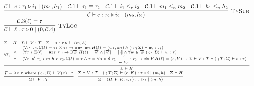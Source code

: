 \documentclass[fleqn]{article}
\begin{document}
\[\begin{array}{l}
	\infer[\textsc{TySub}]{\jtygc{\mathcal{C} }{ e }{\tau_2 }{ i_2 }{ m_2}{h_2}}{\jtygc{\mathcal{C} }{ e }{ \tau_1 }{ i_1 }{ m_1 }{h_1} & \mathcal{C}.1 \vdash \tau_1 \equiv \tau_2 & \mathcal{C}.1 \vdash i_1 \le_r i_2 & \mathcal{C}.1 \vdash m_1 \le_n m_2 & \mathcal{C}.1 \vdash h_1 \le_n h_2} \\
	
	\infer[\textsc{TyLoc}]{\jtygc{\mathcal{C}}{\ell}{\tau}{0}{0}{\mathcal{C}.4}}{ \mathcal{C}.3(\ell) = \tau  }
\end{array}
\]

\[
\scriptsize
\begin{array}{l}
	\Sigma \vdash H \hspace{1em} \Sigma \vdash V : \mathcal{T} \hspace{1em} \Sigma \vdash \sigma : \tau \triangleright i \mid (m, h) \\
	\infer{\Sigma \vdash H}{\forall \ell, \begin{array}{cl} & (\forall \tau_1~\tau_2. \Sigma(\ell) = \tau_1 \times \tau_2 \rightarrow \exists w_1~w_2. H(\ell) = (w_1,w_2) \land (\cdot;\cdot;\Sigma) \vdash w_i : \tau_i ) \\ \land & (\forall \tau~i. \Sigma(\ell)= \mathbf{arr}~\tau~i \rightarrow \exists \overrightarrow{w}. H(\ell) = \overrightarrow{w} \land |\overrightarrow{w}| = \llbracket i \rrbracket \land \forall w \in \overrightarrow{w}. (\cdot;\cdot;\Sigma) \vdash w : \tau  ) \\ \land & (\forall \tau~\overrightarrow{\kappa}~\tau_1~i~m~h~r~\tau_2. \Sigma(\ell)=\tau \land \tau=\forall \overrightarrow{\alpha::\kappa}. \tau_1 \xrightarrow[m,h,r]{i} \tau_2 \rightarrow \exists e~V. H(\ell) = (e, V) \rightarrow \Sigma \vdash V : \mathcal{T} \land (\cdot;\mathcal{T};\Sigma) \vdash e : \tau ) \end{array} } \\
	\infer{\Sigma \vdash V : \mathcal{T}}{\mathcal{T} = \lambda x. \tau \mathrm{~where~} (\cdot;\cdot;\Sigma) \vdash V(x) : \tau   } \hspace{1em}
	\infer{\Sigma \vdash (H,V,K,e,r) : \tau \triangleright i \mid (m , h)}{\Sigma \vdash V : \mathcal{T} & (\cdot;\mathcal{T};\Sigma) \vdash (e,K) : \tau \triangleright i \mid (m,h) & \Sigma \vdash H}
\end{array}
\]
\end{document}
